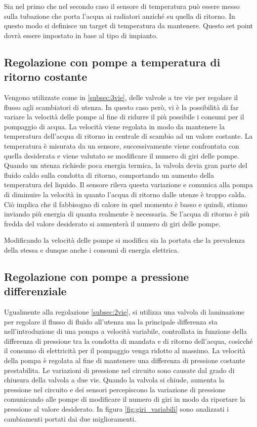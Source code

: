 \documentclass[laurea,oneside,11pt]{USiena_tesiLM}
\begin{document}
Sia nel primo che nel secondo caso il sensore di temperatura può essere messo sulla tubazione che porta l'acqua ai radiatori anziché su quella di ritorno. In questo modo si definisce un target di temperatura da mantenere. Questo set point dovrà essere impostato in base al tipo di impianto.

\subsection{Regolazione con pompe a temperatura di ritorno costante}
Vengono utilizzate come in \ref{subsec:3vie}, delle valvole a tre vie per regolare il flusso agli scambiatori di utenza. In questo caso però, vi è la possibilità di far variare la velocità delle pompe al fine di ridurre il più possibile i consumi per il pompaggio di acqua.
La velocità viene regolata in modo da mantenere la temperatura dell'acqua di ritorno in centrale di scambio ad un valore costante. La temperatura è misurata da un sensore, successivamente viene confrontata con quella desiderata e viene valutato se modificare il numero di giri delle pompe. 
Quando un utenza richiede poca energia termica, la valvola devia gran parte del fluido caldo sulla condotta di ritorno, comportando un aumento della temperatura del liquido. Il sensore rileva questa variazione e comunica alla pompa di diminuire la velocità in quanto l'acqua di ritorno dalle utenze è troppo calda. Ciò implica che il fabbisogno di calore in quel momento è basso e quindi, stiamo inviando più energia di quanta realmente è necessaria. Se l'acqua di ritorno è più fredda del valore desiderato si aumenterà il numero di giri delle pompe. 

Modificando la velocità delle pompe si modifica sia la portata che la prevalenza della stessa e dunque anche i consumi di energia elettrica.

\subsection{Regolazione con pompe a pressione differenziale}
Ugualmente alla regolazione \ref{subsec:2vie}, si utilizza una valvola di laminazione per regolare il flusso di fluido all'utenza ma la principale differenza sta nell'introduzione di una pompa a velocità variabile, controllata in funzione della differenza di pressione tra la condotta di mandata e di ritorno dell'acqua, cosicché il consumo di elettricità per il pompaggio venga ridotto al massimo.
 La velocità della pompa è regolata al fine di mantenere una differenza di pressione costante prestabilita. Le variazioni di pressione nel circuito sono causate dal grado di chiusura della valvola a due vie. Quando la valvola si chiude, aumenta la pressione nel circuito e dei sensori percepiscono la variazione di pressione comunicando alle pompe di modificare il numero di giri in modo da riportare la pressione al valore desiderato. In figura \ref{fig:giri_variabili} sono analizzati i cambiamenti portati dai due miglioramenti.
\end{document}
